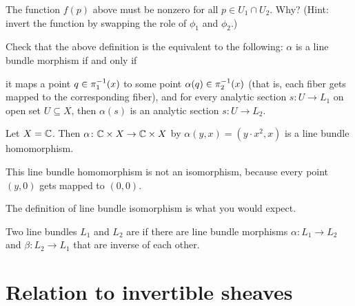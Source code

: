 \begin{exercise}
	The function $f(p)$ above must be nonzero for all $p \in U_1 \cap U_2$. Why? (Hint: invert the
	function by swapping the role of $\phi_1$ and $\phi_2$.)
\end{exercise}

\begin{ques}
	Check that the above definition is the equivalent to the following:
	$\alpha$ is a line bundle morphism if and only if
	\begin{itemize}
		\ii it maps a point $q \in \pi_1^{-1}(x)$ to some point $\alpha(q) \in \pi_2^{-1}(x)$ (that
		is, each fiber gets mapped to the corresponding fiber), and
		\ii for every analytic section $s \colon U \to L_1$ on open set $U \subseteq X$, then
		$\alpha(s)$ is an analytic section $s \colon U \to L_2$.
	\end{itemize}
\end{ques}

\begin{example}
	Let $X = \mathbb C$. Then $\alpha \colon \mathbb C \times X \to \mathbb C \times X$ by $\alpha(y, x) =
	(y \cdot x^2, x)$ is a line bundle homomorphism.

	This line bundle homomorphism is not an isomorphism, because every point $(y, 0)$ gets mapped to
	$(0, 0)$.
\end{example}

The definition of line bundle isomorphism is what you would expect.
\begin{definition}
	Two line bundles $L_1$ and $L_2$ are  if there are line bundle morphisms
	$\alpha \colon L_1 \to L_2$ and $\beta \colon L_2 \to L_1$ that are inverse of each other.
\end{definition}

\section{Relation to invertible sheaves}
